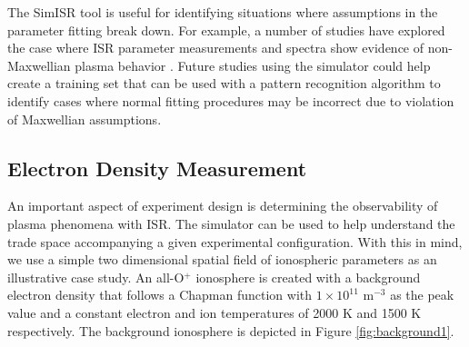 \documentclass[draft,ras]{agutex}
\begin{document}
\begin{article}
The SimISR tool is useful for identifying situations where assumptions in the parameter fitting break down. For example, a number of studies have explored the case where ISR parameter measurements and spectra show evidence of non-Maxwellian plasma behavior \citep[see, e.g.,][for AMISR examples]{Akbari:2012dz,Akbari:2015fv}. Future studies using the simulator could help create a training set that can be used with a pattern recognition algorithm to identify cases where normal fitting procedures may be incorrect due to violation of Maxwellian assumptions.

\subsection{Electron Density Measurement}
An important aspect of experiment design is determining the observability of plasma phenomena with ISR. The simulator can be used to help understand the trade space accompanying a given experimental configuration. With this in mind, we use a simple two dimensional spatial field of ionospheric parameters as an illustrative case study. An all-O$^+$ ionosphere is created with a background electron density that follows a Chapman function with $1\times10^{11}$ m$^{-3}$ as the peak value and a constant electron and ion temperatures of 2000 K and 1500 K respectively. The background ionosphere is depicted in Figure \ref{fig:background1}.


\end{article}
\end{document}
